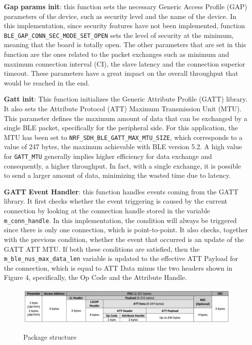 \documentclass{Configuration_Files/PoliMi3i_thesis}
\begin{document}
\textbf{Gap params init}: this function sets the necessary Generic Access Profile (GAP) parameters of the device, such as security level and the name of the device. In this implementation, since security features have not been implemented, function \texttt{BLE\_GAP\_CONN\_SEC\_MODE\_SET\_OPEN} sets the level of security at the minimum, meaning that the board is totally open. The other parameters that are set in this function are the ones related to the packet exchanges such as minimum and maximum connection interval (CI), the slave latency and the connection superior timeout. These parameters have a great impact on the overall throughput that would be reached in the end.

\textbf{Gatt init}: This function initializes the Generic Attribute Profile (GATT) library. It also sets the Attribute Protocol (ATT) Maximum Transmission Unit (MTU). This parameter defines the maximum amount of data that can be exchanged by a single BLE packet, specifically for the peripheral side. For this application, the MTU has been set to \texttt{NRF\_SDH\_BLE\_GATT\_MAX\_MTU\_SIZE}, which corresponds to a value of 247 bytes, the maximum achievable with BLE version 5.2. A high value for \texttt{GATT\_MTU} generally implies higher efficiency for data exchange and consequently, a higher throughput. In fact, with a single exchange, it is possible to send a larger amount of data, minimizing the wasted time due to latency.

\textbf{GATT Event Handler}: this function handles events coming from the GATT library. It first checks whether the event triggering is caused by the current connection by looking at the connection handle stored in the variable \texttt{m\_conn\_handle}. In this implementation, the condition will always be triggered since there is only one connection, which is point-to-point. It also checks, together with the previous condition, whether the event that occurred is an update of the GATT ATT MTU. If both these conditions are satisfied, then the \texttt{m\_ble\_nus\_max\_data\_len} variable is updated to the effective ATT Payload for the connection, which is equal to ATT Data minus the two headers shown in Figure 4, specifically, the Op Code and the Attribute Handle.

\begin{figure}[H]
	\includegraphics[scale=0.3]{Previous Implementation/Screenshot 2024-08-15 at 11.00.56.png}
	\centering
    \label{prev_4}
    \caption{Package structure \cite{afanehBluetoothSpeedHow2023}}
\end{figure}
\end{document}
